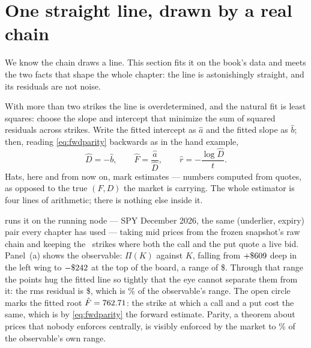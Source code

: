 \section{One straight line, drawn by a real chain}
\label{sec:fwdline}

We know the chain draws a line.  This section fits it on the book's
data and meets the two facts that shape the whole chapter: the line is
astonishingly straight, and its residuals are not noise.

With more than two strikes the line is overdetermined, and the natural
fit is least squares: choose the slope and intercept that minimize the
sum of squared residuals across strikes.  Write the fitted intercept
as $\hat a$ and the fitted slope as $\hat b$; then, reading
\eqref{eq:fwdparity} backwards as in the hand example,
\begin{equation}
\hat D=-\hat b,
\qquad
\hat F=\frac{\hat a}{\hat D},
\qquad
\hat r=-\frac{\log\hat D}{t}.
\label{eq:fwdols}
\end{equation}
Hats, here and from now on, mark estimates --- numbers computed from
quotes, as opposed to the true $(F,D)$ the market is carrying.  The
whole estimator is four lines of arithmetic; there is nothing else
inside it.

 runs it on the running node --- SPY December 2026,
the same (underlier, expiry) pair every chapter has used --- taking
mid prices from the frozen snapshot's raw chain and keeping the
\MacFwdLineNPairs\ strikes where both the call and the put quote a
live bid.  Panel~(a) shows the observable: $\Pi(K)$ against $K$,
falling from $+\$609$ deep in the left wing to
$-\$242$ at the top of the board, a range of
\$\MacFwdLineSpanDollars.  Through
that range the points hug the fitted line so tightly that the eye
cannot separate them from it: the rms residual is
\$\MacFwdLineRmsDollars, which is \MacFwdLineStraightPct\% of the
observable's range.  The open circle marks the fitted root
$\hat F=762.71$: the strike at which a call and a put cost
the same, which is by \eqref{eq:fwdparity} the forward estimate.
Parity, a theorem about prices that nobody enforces centrally, is
visibly enforced by the market to \MacFwdLineStraightPct\% of the
observable's own range.

